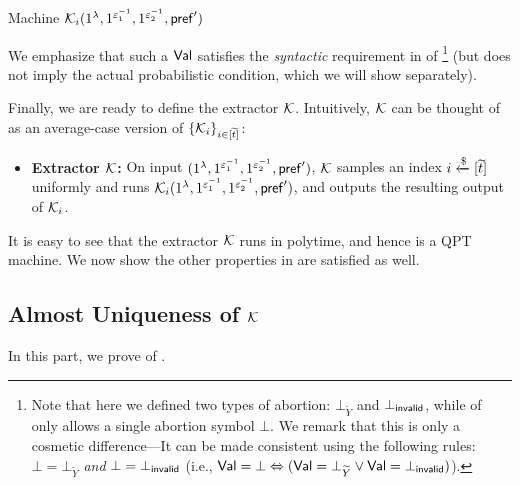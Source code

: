 \begin{AlgorithmBox}[label={algo:K:i}]{Machine \textnormal{$\mathcal{K}_i{(1^\lambda, 1^{\varepsilon_1^{-1}}, 1^{\varepsilon_2^{-1}}, \mathsf{pref}')}$}}
We emphasize that such a $\mathsf{Val}$ satisfies the {\em syntactic} requirement in  of  \footnote{Note that here we defined two types of abortion: $\bot_{\tilde{Y}}$ and $\bot_{\mathsf{invalid}}$, while  of  only allows a single abortion symbol $\bot$. We remark that this is only a cosmetic difference---It can be made consistent using the following rules: $\bot = \bot_{\tilde{Y}}$ {\em and} $\bot = \bot_{\mathsf{invalid}}$ (i.e., $\mathsf{Val} = \bot  \Leftrightarrow (\mathsf{Val} = \bot_{\widetilde{Y}} \vee \mathsf{Val} = \bot_{\mathsf{invalid}})$).} (but does not imply the actual probabilistic condition, which we will show separately).
\end{AlgorithmBox}


Finally, we are ready to define the extractor $\mathcal{K}$. Intuitively, $\mathcal{K}$ can be thought of as an average-case version of $\{\mathcal{K}_i\}_{i\in[\widetilde{t}]}$:
\begin{itemize}
\item
{\bf Extractor $\mathcal{K}$:} On input ${(1^\lambda, 1^{\varepsilon_1^{-1}}, 1^{\varepsilon_2^{-1}}, \mathsf{pref}')}$, $\mathcal{K}$ samples an index $i \xleftarrow{\$} [\widetilde{t}]$ uniformly and runs $\mathcal{K}_i{(1^\lambda, 1^{\varepsilon_1^{-1}}, 1^{\varepsilon_2^{-1}}, \mathsf{pref}')}$, and outputs the resulting output of $\mathcal{K}_i$.  
\end{itemize}
It is easy to see that the extractor $\mathcal{K}$ runs in polytime, and hence is a QPT machine. We now show the other properties in  are satisfied as well. 






\subsection{Almost Uniqueness of $\mathcal{K}$}
\label{sec:proof:K:1-1:almost-uniqueness}
In this part, we prove  of . 

